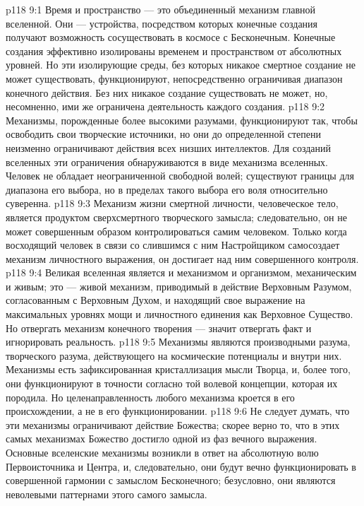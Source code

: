 \vs p118 9:1 Время и пространство --- это объединенный механизм главной вселенной. Они --- устройства, посредством которых конечные создания получают возможность сосуществовать в космосе с Бесконечным. Конечные создания эффективно изолированы временем и пространством от абсолютных уровней. Но эти изолирующие среды, без которых никакое смертное создание не может существовать, функционируют, непосредственно ограничивая диапазон конечного действия. Без них никакое создание существовать не может, но, несомненно, ими же ограничена деятельность каждого создания.
\vs p118 9:2 Механизмы, порожденные более высокими разумами, функционируют так, чтобы освободить свои творческие источники, но они до определенной степени неизменно ограничивают действия всех низших интеллектов. Для созданий вселенных эти ограничения обнаруживаются в виде механизма вселенных. Человек не обладает неограниченной свободной волей; существуют границы для диапазона его выбора, но в пределах такого выбора его воля относительно суверенна.
\vs p118 9:3 Механизм жизни смертной личности, человеческое тело, является продуктом сверхсмертного творческого замысла; следовательно, он не может совершенным образом контролироваться самим человеком. Только когда восходящий человек в связи со слившимся с ним Настройщиком самосоздает механизм личностного выражения, он достигает над ним совершенного контроля.
\vs p118 9:4 Великая вселенная является и механизмом и организмом, механическим и живым; это --- живой механизм, приводимый в действие Верховным Разумом, согласованным с Верховным Духом, и находящий свое выражение на максимальных уровнях мощи и личностного единения как Верховное Существо. Но отвергать механизм конечного творения --- значит отвергать факт и игнорировать реальность.
\vs p118 9:5 Механизмы являются производными разума, творческого разума, действующего на космические потенциалы и внутри них. Механизмы есть зафиксированная кристаллизация мысли Творца, и, более того, они функционируют в точности согласно той волевой концепции, которая их породила. Но целенаправленность любого механизма кроется в его происхождении, а не в его функционировании.
\vs p118 9:6 Не следует думать, что эти механизмы ограничивают действие Божества; скорее верно то, что в этих самых механизмах Божество достигло одной из фаз вечного выражения. Основные вселенские механизмы возникли в ответ на абсолютную волю Первоисточника и Центра, и, следовательно, они будут вечно функционировать в совершенной гармонии с замыслом Бесконечного; безусловно, они являются неволевыми паттернами этого самого замысла.
